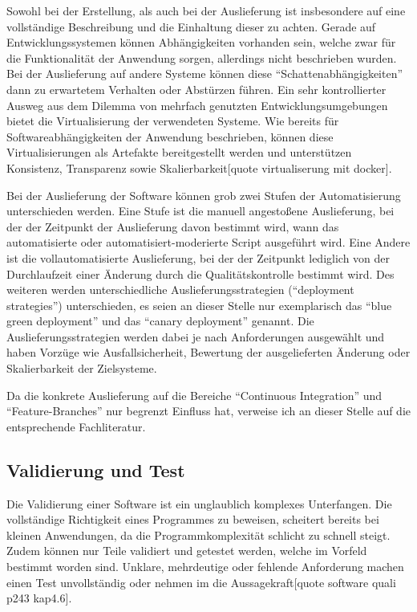 Sowohl bei der Erstellung, als auch bei der Auslieferung ist insbesondere auf eine vollständige Beschreibung und die Einhaltung dieser zu achten. Gerade auf Entwicklungssystemen können Abhängigkeiten vorhanden sein, welche zwar für die Funktionalität der Anwendung sorgen, allerdings nicht beschrieben wurden. Bei der Auslieferung auf andere Systeme können diese ``Schattenabhängigkeiten'' dann zu erwartetem Verhalten oder Abstürzen führen. Ein sehr kontrollierter Ausweg aus dem Dilemma von mehrfach genutzten Entwicklungsumgebungen bietet die Virtualisierung der verwendeten Systeme. Wie bereits für Softwareabhängigkeiten der Anwendung beschrieben, können diese Virtualisierungen als Artefakte bereitgestellt werden und unterstützen Konsistenz, Transparenz sowie Skalierbarkeit[quote virtualiserung mit docker].

Bei der Auslieferung der Software können grob zwei Stufen der Automatisierung unterschieden werden. Eine Stufe ist die manuell angestoßene Auslieferung, bei der der Zeitpunkt der Auslieferung davon bestimmt wird, wann das automatisierte oder automatisiert-moderierte Script ausgeführt wird. Eine Andere ist die vollautomatisierte Auslieferung, bei der der Zeitpunkt lediglich von der Durchlaufzeit einer Änderung durch die Qualitätskontrolle bestimmt wird.
Des weiteren werden unterschiedliche Auslieferungsstrategien (``deployment strategies'') unterschieden, es seien an dieser Stelle nur exemplarisch das ``blue green deployment'' und das ``canary deployment'' genannt. Die Auslieferungsstrategien werden dabei je nach Anforderungen ausgewählt und haben Vorzüge wie Ausfallsicherheit, Bewertung der ausgelieferten Änderung oder Skalierbarkeit der Zielsysteme.

Da die konkrete Auslieferung auf die Bereiche ``Continuous Integration'' und ``Feature-Branches'' nur begrenzt Einfluss hat, verweise ich an dieser Stelle auf die entsprechende Fachliteratur.

\subsection{Validierung und Test}

Die Validierung einer Software ist ein unglaublich komplexes Unterfangen. Die vollständige Richtigkeit eines Programmes zu beweisen, scheitert bereits bei kleinen Anwendungen, da die Programmkomplexität schlicht zu schnell steigt. Zudem können nur Teile validiert und getestet werden, welche im Vorfeld bestimmt worden sind. Unklare, mehrdeutige oder fehlende Anforderung machen einen Test unvollständig oder nehmen im die Aussagekraft[quote software quali p243 kap4.6].

